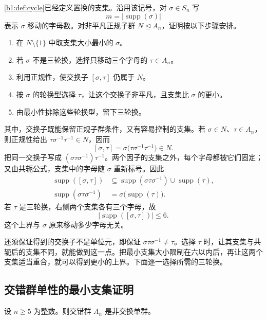 \ProseParagraphBreak

\cref{b1:def:cycle}已经定义置换的支集。沿用该记号，对 \(\sigma\in S_n\) 写
\[
	m=\bigl|\operatorname{supp}(\sigma)\bigr|
\]
表示 \(\sigma\) 移动的字母数。对非平凡正规子群 \(N\trianglelefteq A_n\)，证明按以下步骤安排。
\begin{enumerate}
	\item 在 \(N\setminus\{1\}\) 中取支集大小最小的 \(\sigma\)。
	\item 若 \(\sigma\) 不是三轮换，选择只移动三个字母的 \(\tau\in A_n\)。
	\item 利用正规性，使交换子 \([\sigma,\tau]\) 仍属于 \(N\)。
	\item 按 \(\sigma\) 的轮换型选择 \(\tau\)，让这个交换子非平凡，且支集比 \(\sigma\) 的更小。
	\item 由最小性排除这些轮换型，留下三轮换。
\end{enumerate}

其中，交换子既能保留正规子群条件，又有容易控制的支集。若 \(\sigma\in N\)、\(\tau\in A_n\)，则正规性给出 \(\tau\sigma^{-1}\tau^{-1}\in N\)，因而
\[
	[\sigma,\tau]=\sigma\bigl(\tau\sigma^{-1}\tau^{-1}\bigr)\in N.
\]
把同一交换子写成 \((\sigma\tau\sigma^{-1})\tau^{-1}\)。两个因子的支集之外，每个字母都被它们固定；又由共轭公式，支集中的字母随 \(\sigma\) 重新标号。因此
\[
	\begin{aligned}
		\operatorname{supp}([\sigma,\tau]) &\subseteq \operatorname{supp}(\sigma\tau\sigma^{-1}) \cup\operatorname{supp}(\tau),\\
		\operatorname{supp}(\sigma\tau\sigma^{-1}) &=\sigma\bigl(\operatorname{supp}(\tau)\bigr).
	\end{aligned}
\]
若 \(\tau\) 是三轮换，右侧两个支集各有三个字母，故
\[
	\bigl|\operatorname{supp}([\sigma,\tau])\bigr|\le6.
\]
这个上界与 \(\sigma\) 原来移动多少字母无关。

\ProseParagraphBreak

还须保证得到的交换子不是单位元，即保证 \(\sigma\tau\sigma^{-1}\ne\tau\)。选择 \(\tau\) 时，让其支集与共轭后的支集不同，就能做到这一点。把最小支集大小限制在六以内后，再让这两个支集适当重合，就可以得到更小的上界。下面逐一选择所需的三轮换。

\subsection{交错群单性的最小支集证明}
\label{b1:subsec:0704:02}

\begin{theorem}[交错群的单性]\label{b1:thm:alternating-simple}
	设 \(n\geq5\) 为整数。则交错群 \(A_n\) 是非交换单群。
\end{theorem}


